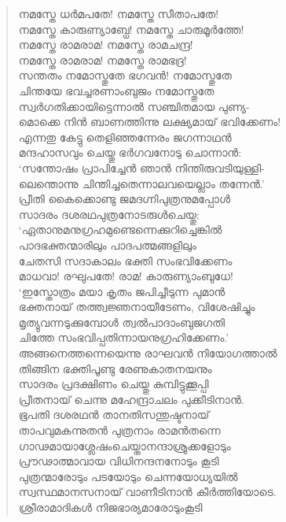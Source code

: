 \begin{verse}
നമസ്തേ ധര്‍മപതേ! നമസ്തേ സീതാപതേ!\\
നമസ്തേ കാരുണ്യാബ്ധേ! നമസ്തേ ചാരുമൂര്‍ത്തേ!\\
നമസ്തേ രാമരാമ! നമസ്തേ രാമചന്ദ്ര!\\
നമസ്തേ രാമരാമ! നമസ്തേ രാമഭദ്ര!\\
സന്തതം നമോസ്തുതേ ഭഗവന്‍! നമോസ്തുതേ\\
ചിന്തയേ ഭവച്ചരണാംബുജം നമോസ്തുതേ\\
സ്വര്‍ഗതിക്കായിട്ടെന്നാല്‍ സഞ്ചിതമായ പുണ്യ-\\
മൊക്കെ നിന്‍ ബാണത്തിന്നു ലക്ഷ്യമായ് ഭവിക്കേണം!\\
എന്നതു കേട്ടു തെളിഞ്ഞന്നേരം ജഗന്നാഥന്‍\\
മന്ദഹാസവും ചെയ്തു ഭര്‍ഗവനോടു ചൊന്നാന്‍:\\
‘സന്തോഷം പ്രാപിച്ചേന്‍ ഞാന്‍ നിന്തിരുവടിയുള്ളി-\\
ലെന്തൊന്നു ചിന്തിച്ചതെന്നാലവയെല്ലാം തന്നേന്‍.’\\
പ്രീതി കൈക്കൊണ്ടു ജമദഗ്നിപുത്രനുമപ്പോള്‍\\
സാദരം ദശരഥപുത്രനോടരുള്‍ചെയ്തു:\\
‘ഏതാനുമനുഗ്രഹമുണ്ടെന്നെക്കുറിച്ചെങ്കില്‍\\
പാദഭക്തന്മാരിലും പാദപത്മങ്ങളിലും\\
ചേതസി സദാകാലം ഭക്തി സംഭവിക്കേണം\\
മാധവാ! രഘുപതേ! രാമ! കാരുണ്യാംബുധേ!\\
‘ഇസ്തോത്രം മയാ കൃതം ജപിച്ചീടുന്ന പുമാന്‍\\
ഭക്തനായ് തത്ത്വജ്ഞനായീടേണം, വിശേഷിച്ചും\\
മൃത്യുവന്നടുക്കുമ്പോള്‍ ത്വല്‍പാദാംബുജഗതി\\
ചിത്തേ സംഭവിപ്പതിന്നായനുഗ്രഹിക്കേണം.’\\
അങ്ങനെത്തന്നെയെന്നു രാഘവന്‍ നിയോഗത്താല്‍\\
തിങ്ങിന ഭക്തിപൂണ്ടു രേണുകാതനയനും\\
സാദരം പ്രദക്ഷിണം ചെയ്തു കുമ്പിട്ടുക്കൂപ്പി\\
പ്രീതനായ് ചെന്നു മഹേന്ദ്രാചലം പുക്കീടിനാന്‍.\\
ഭൂപതി ദശരഥന്‍ താനതിസന്തുഷ്ടനായ്\\
താപവുമകന്നുതന്‍ പുത്രനാം രാമന്‍തന്നെ\\
ഗാഢമായാശ്ലേഷംചെയ്താനന്ദാശ്രുക്കളോടും\\
പ്രൗഢാത്മാവായ വിധിനന്ദനനോടും കൂടി\\
പുത്രന്മാരോടും പടയോടും ചെന്നയോധ്യയില്‍\\
സ്വസ്ഥമാനസനായ് വാണീടിനാന്‍ കീര്‍ത്തിയോടെ.\\
ശ്രീരാമാദികള്‍ നിജഭാര്യമാരോടുംകൂടി\\

\end{verse}
